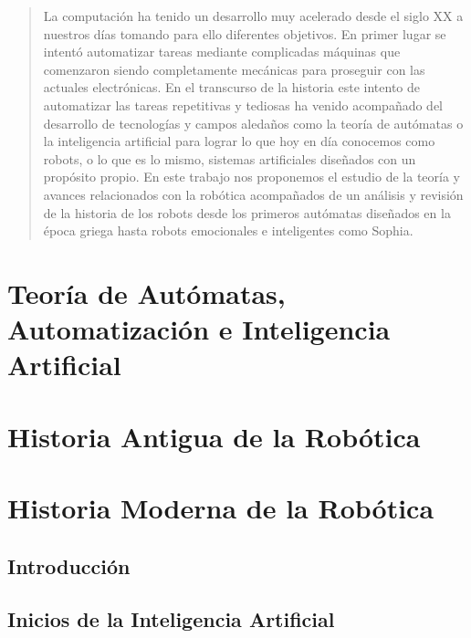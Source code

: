 \documentclass[a4paper,11pt]{article}
\begin{document}
	\newpage
\begin{abstract}
	La computación ha tenido un desarrollo muy acelerado desde el siglo XX a nuestros días tomando para ello diferentes objetivos. En primer lugar se intentó automatizar tareas mediante complicadas máquinas que comenzaron siendo completamente mecánicas para proseguir con las actuales electrónicas. En el transcurso de la historia este intento de automatizar las tareas repetitivas y tediosas ha venido acompañado del desarrollo de tecnologías y campos aledaños como la teoría de autómatas o la inteligencia artificial para lograr lo que hoy en día conocemos como robots, o lo que es lo mismo, sistemas artificiales diseñados con un propósito propio. En este trabajo nos proponemos el estudio de la teoría y avances relacionados con la robótica acompañados de un análisis y revisión de la historia de los robots desde los primeros autómatas diseñados en la época griega hasta robots emocionales e inteligentes como Sophia.
\end{abstract}

\newpage

\tableofcontents

\newpage

\section{Teoría de Autómatas, Automatización e Inteligencia Artificial}


\section{Historia Antigua de la Robótica}


\section{Historia Moderna de la Robótica}

\subsection{Introducción}


\subsection{Inicios de la Inteligencia Artificial}

\end{document}
